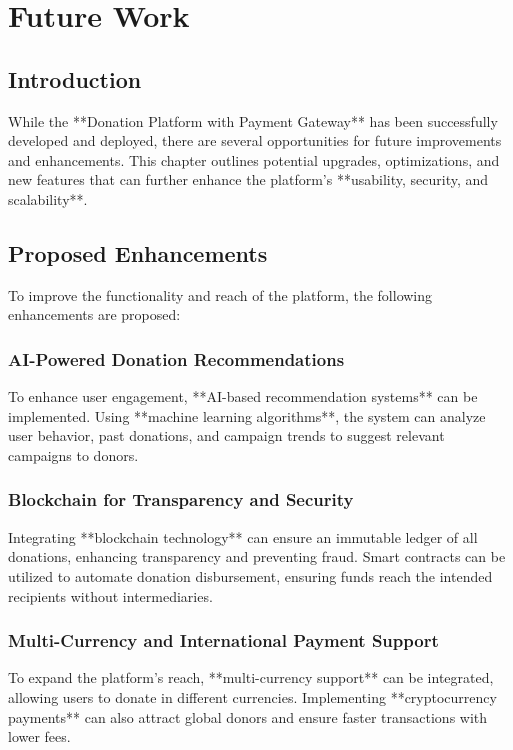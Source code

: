 \chapter{Future Work}

\section{Introduction}
While the **Donation Platform with Payment Gateway** has been successfully developed and deployed, there are several opportunities for future improvements and enhancements. This chapter outlines potential upgrades, optimizations, and new features that can further enhance the platform’s **usability, security, and scalability**. 

\section{Proposed Enhancements}
To improve the functionality and reach of the platform, the following enhancements are proposed:

\subsection{AI-Powered Donation Recommendations}
To enhance user engagement, **AI-based recommendation systems** can be implemented. Using **machine learning algorithms**, the system can analyze user behavior, past donations, and campaign trends to suggest relevant campaigns to donors.

\subsection{Blockchain for Transparency and Security}
Integrating **blockchain technology** can ensure an immutable ledger of all donations, enhancing transparency and preventing fraud. Smart contracts can be utilized to automate donation disbursement, ensuring funds reach the intended recipients without intermediaries.

\subsection{Multi-Currency and International Payment Support}
To expand the platform's reach, **multi-currency support** can be integrated, allowing users to donate in different currencies. Implementing **cryptocurrency payments** can also attract global donors and ensure faster transactions with lower fees.


